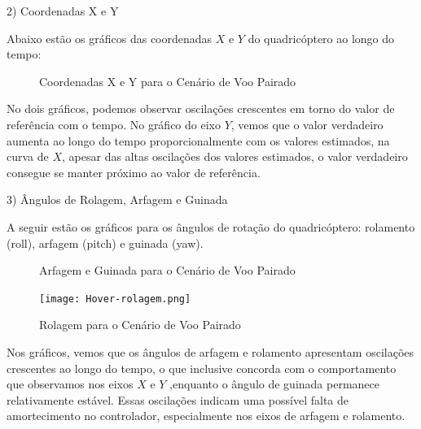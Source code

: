 2) Coordenadas X e Y

Abaixo estão os gráficos das coordenadas \(X\) e \(Y\) do quadricóptero ao longo do tempo:

\begin{figure}[htbp]
    \centering
    \hfill
    \caption{Coordenadas X e Y para o Cenário de Voo Pairado}
    \label{fig:hover-x-y-coordenadas}
\end{figure}

No dois gráficos, podemos observar oscilações crescentes em torno do valor de referência com o tempo. No gráfico do eixo \(Y\), vemos que o valor verdadeiro aumenta ao longo do tempo proporcionalmente com os valores estimados, na curva de \(X\), apesar das altas oscilações dos valores estimados, o valor verdadeiro consegue se manter próximo ao valor de referência.


3) Ângulos de Rolagem, Arfagem e Guinada

A seguir estão os gráficos para os ângulos de rotação do quadricóptero: rolamento (roll), arfagem (pitch) e guinada (yaw).

\begin{figure}[htbp]
    \centering
    \hfill
    \caption{Arfagem e Guinada para o Cenário de Voo Pairado}
    \label{fig:hover-arfagem-guinada}
\end{figure}

\begin{figure}[H]
	\centering
	\texttt{[image: Hover-rolagem.png]}
	\caption{Rolagem para o Cenário de Voo Pairado}
	\label{fig:hover-rolagem}
\end{figure}

Nos gráficos, vemos que os ângulos de arfagem e rolamento apresentam oscilações crescentes ao longo do tempo, o que inclusive concorda com o comportamento que observamos nos eixos  \(X\) e  \(Y\) ,enquanto o ângulo de guinada permanece relativamente estável. Essas oscilações indicam uma possível falta de amortecimento no controlador, especialmente nos eixos de arfagem e rolamento.

